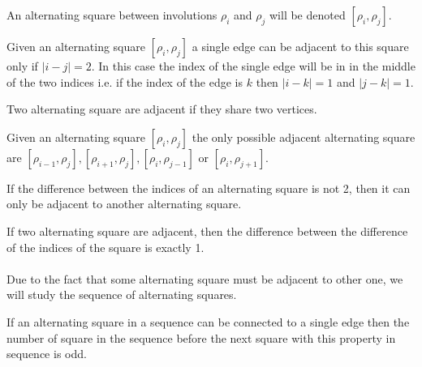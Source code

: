 \begin{notation}
  An alternating square between involutions $\rho_i$ and $\rho_j$ will be denoted $[\rho_i, \rho_j]$.
\end{notation}

\begin{proposition}
  \label{square-connection}
  Given an alternating square $[\rho_i, \rho_j]$ a single edge can be adjacent to this square only if $|i - j| = 2$. In this case the index of the single edge will be in in the middle of the two indices i.e. if the index of the edge is $k$ then $|i-k| = 1$ and $|j-k| = 1$.
\end{proposition}

\begin{definition}
  Two alternating square are adjacent if they share two vertices.
\end{definition}

\begin{proposition}
  \label{adjacent-squares}
  Given an alternating square $[\rho_i, \rho_j]$ the only possible adjacent alternating square are $[\rho_{i-1}, \rho_j], [\rho_{i+1}, \rho_j], [\rho_i, \rho_{j-1}]$ or $[\rho_i, \rho_{j+1}]$.
\end{proposition}

\begin{corollary}
  \label{continue-alternating-square}
  If the difference between the indices of an alternating square is not 2, then it can only be adjacent to another alternating square.
\end{corollary}

\begin{corollary}
  If two alternating square are adjacent, then the difference between the difference of the indices of the square is exactly 1.
\end{corollary}

\paragraph{}
Due to the fact that some alternating square must be adjacent to other one, we will study the sequence of alternating squares.

\begin{corollary}
  \label{parity-sequence-squares}
  If an alternating square in a sequence can be connected to a single edge then the number of square in the sequence before the next square with this property in sequence is odd.
\end{corollary}

